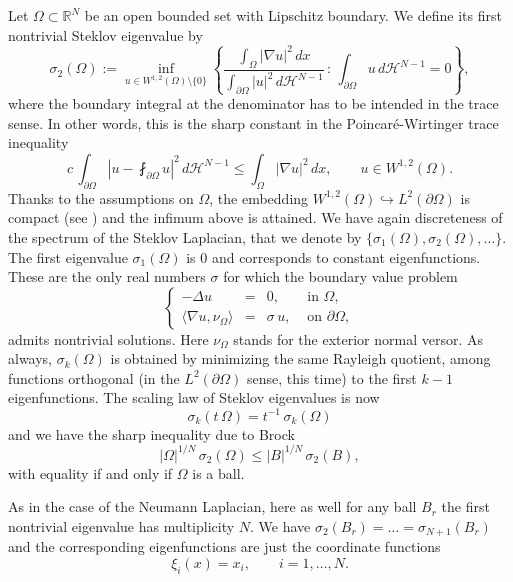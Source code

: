 \documentclass{amsart}
\theoremstyle{definition}
\numberwithin{equation}{section}
\begin{document}
Let $\Omega\subset\mathbb{R}^N$ be an open bounded set with Lipschitz boundary. We define its first nontrivial Steklov eigenvalue by
\[
\sigma_2(\Omega):=\inf_{u\in W^{1,2}(\Omega)\setminus\{0\}}\left\{\frac{\displaystyle\int_\Omega |\nabla u|^2\, dx}{\displaystyle\int_{\partial\Omega} |u|^2\, d\mathcal{H}^{N-1}}\, :\, \int_{\partial\Omega} u\, d\mathcal{H}^{N-1}=0\right\},
\] 
where the boundary integral at the denominator has to be intended in the trace sense.
In other words, this is the sharp constant in the Poincar\'e-Wirtinger trace inequality
\[
c\,\int_{\partial\Omega} \left|u-\fint_{\partial\Omega} u\right|^2\,d\mathcal{H}^{N-1}\le \int_\Omega |\nabla u|^2\,dx,\qquad u\in W^{1,2}(\Omega).
\]
Thanks to the assumptions on $\Omega$, the embedding $W^{1,2}(\Omega)\hookrightarrow L^2(\partial\Omega)$ is compact (see \cite[Section 6.10.5]{MR0482102}) and the infimum above is attained. We have again discreteness of the spectrum of the Steklov Laplacian, that we denote by $\{\sigma_1(\Omega),\sigma_2(\Omega),\dots\}$. The first eigenvalue $\sigma_1(\Omega)$ is $0$ and corresponds to constant eigenfunctions. These are the only real numbers $\sigma$ for which the boundary value problem
\[
\left\{\begin{array}{rcll}
-\Delta u&=&0,& \mbox{ in } \Omega,\\
\langle \nabla u,\nu_\Omega\rangle&=&\sigma\, u,& \mbox{ on }\partial\Omega,
\end{array}
\right.
\]
admits nontrivial solutions. Here $\nu_\Omega$ stands for the exterior normal versor. As always, $\sigma_k(\Omega)$ is obtained by minimizing the same Rayleigh quotient, among functions orthogonal (in the $L^2(\partial\Omega)$ sense, this time) to the first $k-1$ eigenfunctions.
The scaling law of Steklov eigenvalues is now
\[
\sigma_k(t\,\Omega)=t^{-1}\,\sigma_k(\Omega)
\]
and we have the sharp inequality due to Brock
\begin{equation}
\label{brocco}
|\Omega|^{1/N}\, \sigma_2(\Omega)\le |B|^{1/N}\,\sigma_2(B),
\end{equation}
with equality if and only if $\Omega$ is a ball. 
\par
As in the case of the Neumann Laplacian, here as well for any ball $B_r$ the first nontrivial eigenvalue has multiplicity $N$. We have $\sigma_2(B_r)=\dots=\sigma_{N+1}(B_r)$ and the corresponding eigenfunctions are just the coordinate functions
\begin{equation}
\label{eigenballstek}
\xi_i(x)=x_i,\qquad i=1,\dots,N.
\end{equation}
\end{document}
